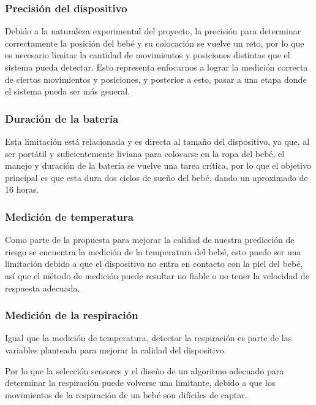 \subsubsection{Precisión del dispositivo}

Debido a la naturaleza experimental del proyecto, la precisión para determinar correctamente la posición del bebé y su colocación se vuelve un reto, por lo que es necesario limitar la cantidad de movimientos y posiciones distintas que el sistema pueda detectar.
Esto representa enfocarnos a lograr la medición correcta de ciertos movimientos y posiciones, y posterior a esto, pasar a una etapa donde el sistema pueda ser más general. 

\subsubsection{Duración de la batería}

Esta limitación está relacionada y es directa al tamaño del dispositivo, ya que, al ser portátil y suficientemente liviana para colocarse en la ropa del bebé, el manejo y duración de la batería se vuelve una tarea crítica, por lo que el objetivo principal es que esta dura dos ciclos de sueño del bebé, dando un aproximado de 16 horas.

\subsubsection{Medición de temperatura}

Como parte de la propuesta para mejorar la calidad de nuestra predicción de riesgo se encuentra la medición de la temperatura del bebé, esto puede ser una limitación debido a que el dispositivo no entra en contacto con la piel del bebé, así que el método de medición puede resultar no fiable o no tener la velocidad de respuesta adecuada.

\subsubsection{Medición de la respiración}

Igual que la medición de temperatura, detectar la respiración es parte de las variables planteada para mejorar la calidad del dispositivo.

Por lo que la selección sensores y el diseño de un algoritmo adecuado para determinar la respiración puede volverse una limitante, debido a que los movimientos de la respiración de un bebé son difíciles de captar.

